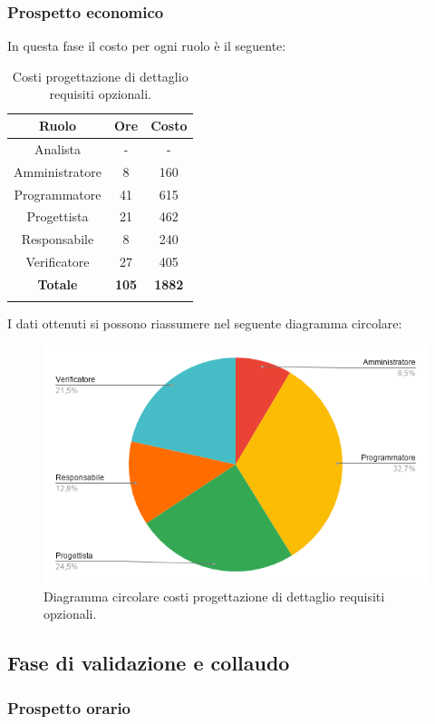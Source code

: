 \subsubsection{Prospetto economico}

In questa fase il costo per ogni ruolo è il seguente:
\begin{longtable}{|c|c|c|}
	\hline
	\rowcolor[HTML]{F9CB9C} 
	\textbf{Ruolo} & \textbf{Ore} & \textbf{Costo} \\
	\hline
	Analista &
	- &
	-\\
	\hline
	Amministratore &
	8 &
	160 \\
	\hline
	Programmatore &
	41 &
	615 \\
	\hline
	Progettista &
	21 &
	462 \\
	\hline
	Responsabile  &
	8 &
	240 \\
	\hline
	Verificatore &
	27 &
	405 \\
	\hline
	\rowcolor[HTML]{F9CB9C} 
	\textbf{Totale} & \textbf{105} & \textbf{1882} \\
	\hline
	\caption{Costi progettazione di dettaglio requisiti opzionali.}
	\label{fig: Costi progettazione di dettaglio requisiti opzionali.}
\end{longtable}

I dati ottenuti si possono riassumere nel seguente diagramma circolare:
\begin{figure}[H]
	\centering
	\includegraphics[width=0.6\linewidth]{./res/images/CostiOpzionali.png}
	\caption{Diagramma circolare costi progettazione di dettaglio requisiti opzionali.}
	\label{fig: Diagramma circolare costi progettazione di dettaglio requisiti opzionali.}
\end{figure}			
		
			
%
%
%
%
\subsection{Fase di validazione e collaudo}

\subsubsection{Prospetto orario}

